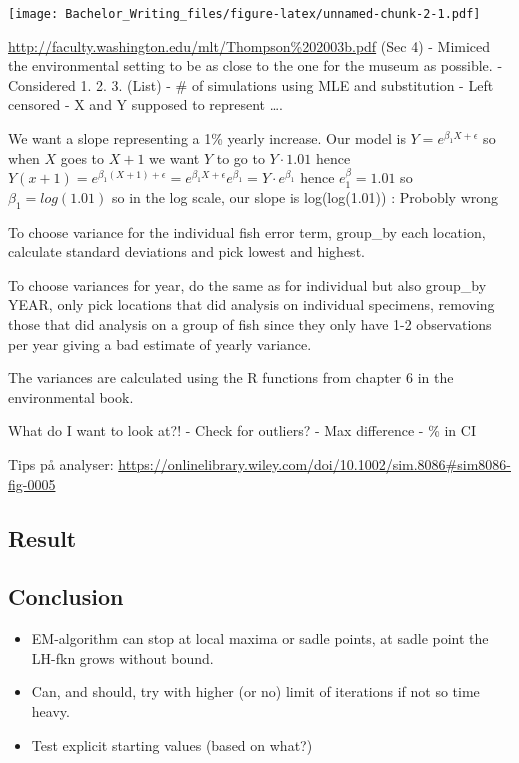 \documentclass[]{article}
\providecommand{\tightlist}{%
  \setlength{\itemsep}{0pt}\setlength{\parskip}{0pt}}
\begin{document}
\texttt{[image: Bachelor\_Writing\_files/figure-latex/unnamed-chunk-2-1.pdf]}

\url{http://faculty.washington.edu/mlt/Thompson\%202003b.pdf} (Sec 4) -
Mimiced the environmental setting to be as close to the one for the
museum as possible. - Considered 1. 2. 3. (List) - \# of simulations
using MLE and substitution - Left censored - X and Y supposed to
represent \ldots{}.

We want a slope representing a 1\% yearly increase. Our model is
\(Y=e^{\beta_1 X + \epsilon}\) so when \(X\) goes to \(X+1\) we want
\(Y\) to go to \(Y\cdot 1.01\) hence
\(Y(x+1)=e^{\beta_1 (X + 1) + \epsilon} = e^{\beta_1 X + \epsilon}e^{\beta_1}=Y\cdot e^{\beta_1}\)
hence \(e^\beta_1=1.01\) so \(\beta_1=log(1.01)\) so in the log scale,
our slope is log(log(1.01)) : Probobly wrong

To choose variance for the individual fish error term, group\_by each
location, calculate standard deviations and pick lowest and highest.

To choose variances for year, do the same as for individual but also
group\_by YEAR, only pick locations that did analysis on individual
specimens, removing those that did analysis on a group of fish since
they only have 1-2 observations per year giving a bad estimate of yearly
variance.

The variances are calculated using the R functions from chapter 6 in the
environmental book.

What do I want to look at?! - Check for outliers? - Max difference - \%
in CI

Tips på analyser:
\url{https://onlinelibrary.wiley.com/doi/10.1002/sim.8086\#sim8086-fig-0005}

\subsection{Result}\label{result}

\subsection{Conclusion}\label{conclusion}

\begin{itemize}
\tightlist
\item
  EM-algorithm can stop at local maxima or sadle points, at sadle point
  the LH-fkn grows without bound.
\item
  Can, and should, try with higher (or no) limit of iterations if not so
  time heavy.
\item
  Test explicit starting values (based on what?)
\end{itemize}
\end{document}
